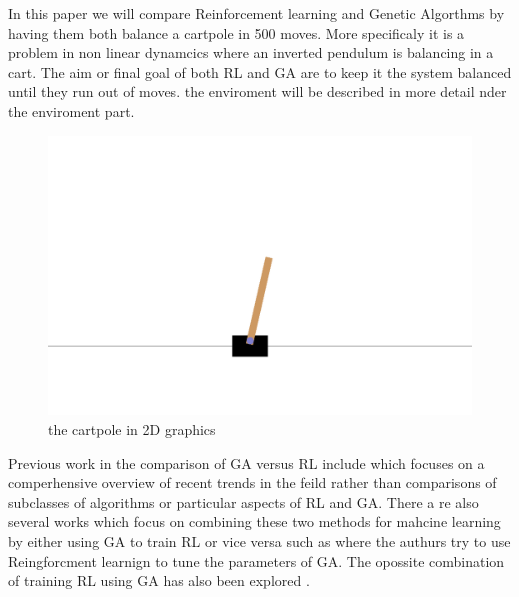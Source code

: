 In this paper we will compare Reinforcement learning and Genetic Algorthms by having them both balance a cartpole in 500 moves. More specificaly it is a problem in non linear dynamcics where an inverted pendulum is balancing in a cart. The aim or final goal of both RL and GA are to keep it the system balanced until they run out of moves. the enviroment will be described in more detail nder the enviroment part.  
\begin{figure}[H]
    \centering
    \includegraphics [scale = 0.2]{Images/cartpole.png}
    \caption{the cartpole in 2D graphics}
    \label{figRL}
\end{figure}
Previous work in the comparison of GA versus RL include \cite{drugan2019reinforcement} which focuses on a comperhensive overview of recent trends in the feild rather than comparisons of subclasses of algorithms or particular aspects of RL and GA. There a re also several works which focus on combining these two methods for mahcine learning by either using GA to train RL or vice versa such as \cite{eiben2007reinforcement} where the authurs try to use Reingforcment learnign to tune the parameters of GA. The opossite combination of training RL using GA has also been explored \cite{khadka2018evolutionary}.



